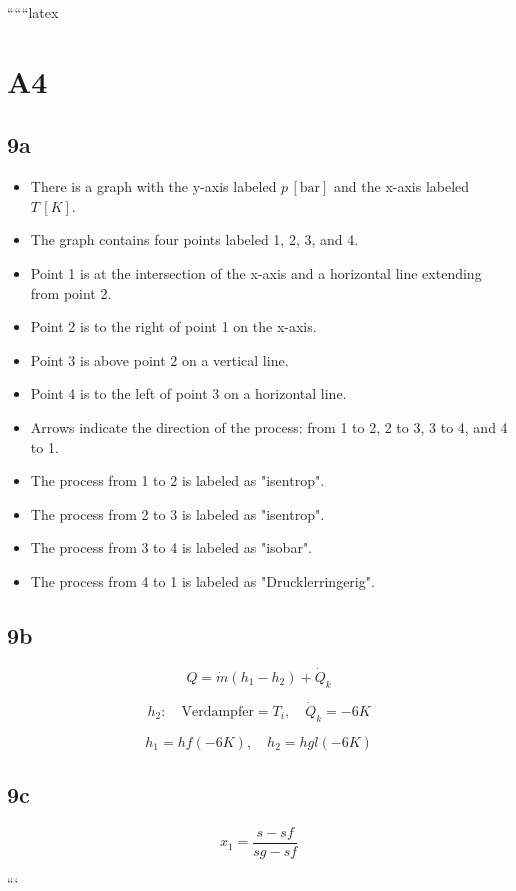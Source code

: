 
``````latex


\section*{A4}

\subsection*{9a}

\begin{itemize}
    \item There is a graph with the y-axis labeled \( p \, [\text{bar}] \) and the x-axis labeled \( T \, [K] \).
    \item The graph contains four points labeled 1, 2, 3, and 4.
    \item Point 1 is at the intersection of the x-axis and a horizontal line extending from point 2.
    \item Point 2 is to the right of point 1 on the x-axis.
    \item Point 3 is above point 2 on a vertical line.
    \item Point 4 is to the left of point 3 on a horizontal line.
    \item Arrows indicate the direction of the process: from 1 to 2, 2 to 3, 3 to 4, and 4 to 1.
    \item The process from 1 to 2 is labeled as "isentrop".
    \item The process from 2 to 3 is labeled as "isentrop".
    \item The process from 3 to 4 is labeled as "isobar".
    \item The process from 4 to 1 is labeled as "Drucklerringerig".
\end{itemize}

\subsection*{9b}

\[
Q = \dot{m} (h_1 - h_2) + \dot{Q}_k
\]

\[
h_2: \quad \text{Verdampfer} = T_i, \quad \dot{Q}_k = -6K
\]

\[
h_1 = hf(-6K), \quad h_2 = hgl(-6K)
\]

\subsection*{9c}

\[
x_1 = \frac{s - sf}{sg - sf}
\]

```
